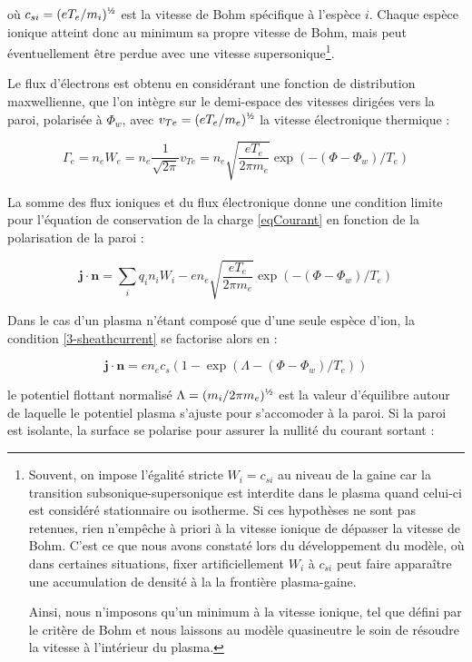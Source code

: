 \begin{refsection}
où $c_{si}=(eT_e/m_i)^{\text{\textonehalf}}$ est la vitesse de Bohm
spécifique à l'espèce $i$.
Chaque espèce ionique atteint donc au minimum sa propre vitesse de Bohm, mais
peut éventuellement être perdue avec une vitesse
supersonique\footnote{Souvent, on impose l'égalité stricte $W_i=c_{si}$ au
niveau de la gaine car la transition subsonique-supersonique est interdite dans
le plasma quand celui-ci est considéré stationnaire ou isotherme. Si ces
hypothèses ne sont pas retenues, rien n'empêche à priori à la vitesse ionique de
dépasser la vitesse de Bohm. C'est ce que nous avons constaté lors du
développement du modèle, où dans certaines situations, fixer artificiellement
$W_i$ à $c_{si}$ peut faire apparaître une accumulation de densité à la la
frontière plasma-gaine.

Ainsi, nous n'imposons qu'un minimum à la vitesse ionique, tel que défini par
le critère de Bohm et nous laissons au modèle quasineutre le soin de résoudre la
vitesse à l'intérieur du plasma.}.

Le flux d'électrons est obtenu en considérant une fonction de distribution
maxwellienne, que l'on intègre sur le demi-espace des vitesses dirigées vers la
paroi, polarisée à $\Phi_w$, avec $v_{Te}=(eT_e/m_e)^{\text{\textonehalf}}$ la
vitesse électronique thermique :

\begin{equation}
\Gamma_e=n_eW_e=n_e\frac{1}{\sqrt{2\pi}}v_{Te}=n_e\sqrt{\frac{eT_e}{2\pi
m_e}}\exp(-(\Phi-\Phi_w)/T_e)
\end{equation}

La somme des flux
ioniques et du flux électronique donne une condition limite pour l'équation de
conservation de la charge \eqref{eqCourant} en fonction de la polarisation de la paroi
:

\begin{equation}
\label{3-sheathcurrent}
\mathbf{j}\cdot\mathbf{n}=\sum_i{q_in_iW_i}
-en_e\sqrt{\frac{eT_e}{2\pi
m_e}}\exp(-(\Phi-\Phi_w)/T_e)
\end{equation}

Dans
le cas d'un plasma n'étant composé que d'une seule espèce d'ion, 
la condition \ref{3-sheathcurrent} se factorise alors en :

\begin{equation}
\mathbf{j}\cdot\mathbf{n}=en_ec_s(1-\exp(\Lambda-(\Phi-\Phi_w)/T_e))
\end{equation}

le potentiel flottant normalisé $\Lambda=({m_i}/{2\pi
m_e})^{\text{\textonehalf}}$ est la valeur d'équilibre autour de laquelle
le potentiel plasma s'ajuste pour s'accomoder à la paroi.
Si la paroi est isolante, la surface se polarise
pour assurer la nullité du courant sortant :


\end{refsection}
